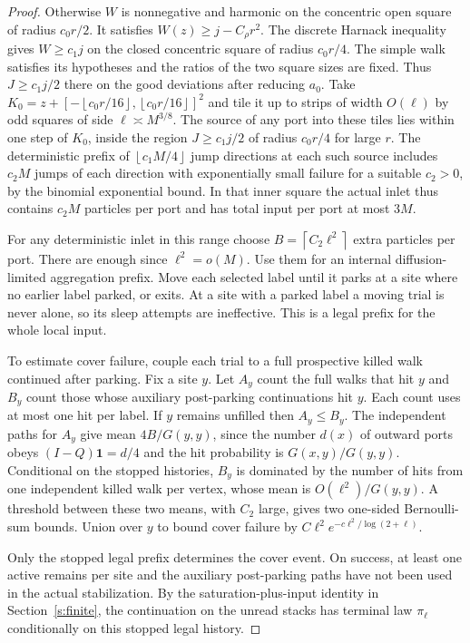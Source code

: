 \documentclass[11pt]{amsart}
\newcommand{\1}{\mathbf 1}
\newcommand{\floor}[1]{\left\lfloor #1\right\rfloor}
\newcommand{\ceil}[1]{\left\lceil #1\right\rceil}
\begin{document}
\begin{proof}
Otherwise \(W\) is nonnegative and harmonic on the concentric open square of radius \(c_0r/2\). It satisfies \(W(z)\ge j-C_\rho r^2\). The discrete Harnack inequality \cite[Theorem~6.3.9]{LawlerLimic} gives \(W\ge c_1j\) on the closed concentric square of radius \(c_0r/4\). The simple walk satisfies its hypotheses and the ratios of the two square sizes are fixed. Thus \(J\ge c_1j/2\) there on the good deviations after reducing \(a_0\). Take \(K_0=z+[-\floor{c_0r/16},\floor{c_0r/16}]^2\) and tile it up to strips of width \(O(\ell)\) by odd squares of side \(\ell\asymp M^{3/8}\). The source of any port into these tiles lies within one step of \(K_0\), inside the region \(J\ge c_1j/2\) of radius \(c_0r/4\) for large \(r\). The deterministic prefix of \(\floor{c_1M/4}\) jump directions at each such source includes \(c_2M\) jumps of each direction with exponentially small failure for a suitable \(c_2>0\), by the binomial exponential bound. In that inner square the actual inlet thus contains \(c_2M\) particles per port and has total input per port at most \(3M\).

For any deterministic inlet in this range choose \(B=\ceil{C_2\ell^2}\) extra particles per port. There are enough since \(\ell^2=o(M)\). Use them for an internal diffusion-limited aggregation prefix. Move each selected label until it parks at a site where no earlier label parked, or exits. At a site with a parked label a moving trial is never alone, so its sleep attempts are ineffective. This is a legal prefix for the whole local input.

To estimate cover failure, couple each trial to a full prospective killed walk continued after parking. Fix a site \(y\). Let \(A_y\) count the full walks that hit \(y\) and \(B_y\) count those whose auxiliary post-parking continuations hit \(y\). Each count uses at most one hit per label. If \(y\) remains unfilled then \(A_y\le B_y\). The independent paths for \(A_y\) give mean \(4B/G(y,y)\), since the number \(d(x)\) of outward ports obeys \((I-Q)\1=d/4\) and the hit probability is \(G(x,y)/G(y,y)\). Conditional on the stopped histories, \(B_y\) is dominated by the number of hits from one independent killed walk per vertex, whose mean is \(O(\ell^2)/G(y,y)\). A threshold between these two means, with \(C_2\) large, gives two one-sided Bernoulli-sum bounds. Union over \(y\) to bound cover failure by \(C\ell^2 e^{-c\ell^2/\log(2+\ell)}\).

Only the stopped legal prefix determines the cover event. On success, at least one active remains per site and the auxiliary post-parking paths have not been used in the actual stabilization. By the saturation-plus-input identity in Section~\ref{s:finite}, the continuation on the unread stacks has terminal law \(\pi_\ell\) conditionally on this stopped legal history.


\end{proof}
\end{document}
